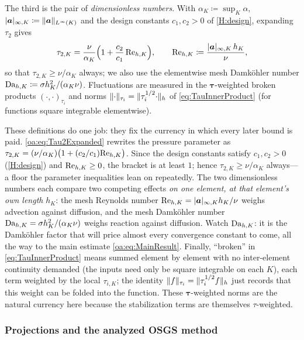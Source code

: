 The third is the pair of \emph{dimensionless numbers}. With $\alpha_K \coloneqq \sup_K \alpha$,
$|\boldsymbol{a}|_{\infty,K} \coloneqq \lVert \boldsymbol{a} \rVert_{L^\infty(K)}$ and the design constants $c_1,c_2>0$ of \cref{H:design},
expanding $\tau_2$ gives
\begin{equation}
  \label{oa:eq:Tau2Expanded}
  \tau_{2,K}
  = \frac{\nu}{\alpha_K}\Bigl( 1 + \frac{c_2}{c_1}\,\mathrm{Re}_{h,K} \Bigr),
  \qquad
  \mathrm{Re}_{h,K} \coloneqq \frac{|\boldsymbol{a}|_{\infty,K}\, h_K}{\nu},
\end{equation}
so that $\tau_{2,K} \ge \nu/\alpha_K$ always; we also use the elementwise mesh Damk\"ohler number
$\mathrm{Da}_{h,K} \coloneqq \sigma h_K^2/(\alpha_K\nu)$. Fluctuations are measured in the $\boldsymbol{\tau}${\hyp}weighted
broken products $(\cdot,\cdot)_{\tau_i}$ and norms $\lVert \cdot \rVert_{\tau_i} = \lVert \tau_i^{1/2}\cdot\rVert_h$
of \cref{eq:TauInnerProduct} (for functions square integrable elementwise).

\begin{pedagogy}
These definitions do one job: they fix the currency in which every later
bound is paid. \cref{oa:eq:Tau2Expanded} rewrites the pressure parameter as
$\tau_{2,K} = (\nu/\alpha_K)\bigl(1 + (c_2/c_1)\mathrm{Re}_{h,K}\bigr)$. Since the design
constants satisfy $c_1,c_2>0$ (\cref{H:design}) and $\mathrm{Re}_{h,K}\ge 0$, the bracket is at
least $1$; hence $\tau_{2,K}\ge \nu/\alpha_K$ always---a floor the parameter
inequalities lean on repeatedly. The two dimensionless numbers each compare two
competing effects \emph{on one element, at that element's own length} $h_K$: the
mesh Reynolds number $\mathrm{Re}_{h,K} = |\boldsymbol{a}|_{\infty,K}h_K/\nu$ weighs advection against
diffusion, and the mesh Damk\"ohler number $\mathrm{Da}_{h,K} = \sigma h_K^2/(\alpha_K\nu)$
weighs reaction against diffusion. Watch $\mathrm{Da}_{h,K}$: it is the Damk\"ohler factor that
will price almost every convergence constant to come, all the way to the main
estimate \cref{oa:eq:MainResult}. Finally, ``broken'' in \cref{eq:TauInnerProduct}
means summed element by element with no inter-element continuity demanded (the
inputs need only be square integrable on each $K$), each term weighted by the
local $\tau_{i,K}$; the identity $\lVert f \rVert_{\tau_i}=\lVert\tau_i^{1/2}f\rVert_h$
just records that this weight can be folded into the function. These
$\boldsymbol{\tau}$-weighted norms are the natural currency here because the
stabilization terms are themselves $\tau$-weighted.
\end{pedagogy}

\subsubsection{Projections and the analyzed OSGS method}
\label{oa:sec:method}

